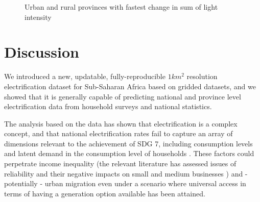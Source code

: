 \documentclass[preprint,12pt]{elsarticle}
\begin{document}
\begin{figure}[H]
    \centering
    \qquad
    \caption{Urban and rural provinces with fastest change in sum of light intensity}
    \label{distribution}
\end{figure}

\section{Discussion}
We introduced a new, updatable, fully-reproducible $1 km^2$ resolution electrification dataset for Sub-Saharan Africa based on gridded datasets, and we showed that it is generally capable of predicting national and province level electrification data from household surveys and national statistics. 

The analysis based on the data has shown that electrification is a complex concept, and that national electrification rates fail to capture an array of dimensions relevant to the achievement of SDG 7, including consumption levels and latent demand in the consumption level of households \citep{poblete-cazenave_income_nodate}. These factors could perpetrate income inequality (the relevant literature has assessed issues of reliability and their negative impacts on small and medium businesses \citep{cole2018power, gannon2018business}) and - potentially - urban migration even under a scenario where universal access in terms of having a generation option available has been attained. 
\end{document}
